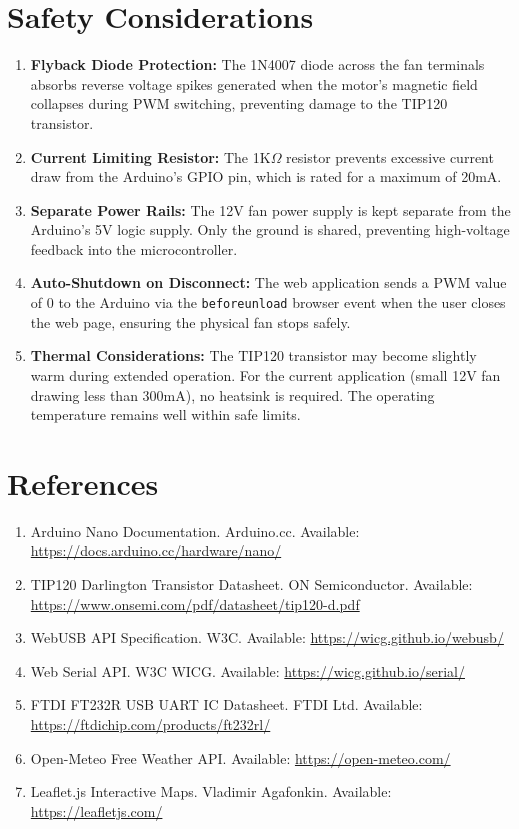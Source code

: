 \documentclass[12pt,a4paper]{article}
\begin{document}
\newpage

\section{Safety Considerations}

\begin{enumerate}
    \item \textbf{Flyback Diode Protection:} The 1N4007 diode across the fan terminals absorbs reverse voltage spikes generated when the motor's magnetic field collapses during PWM switching, preventing damage to the TIP120 transistor.
    
    \item \textbf{Current Limiting Resistor:} The 1K$\Omega$ resistor prevents excessive current draw from the Arduino's GPIO pin, which is rated for a maximum of 20mA.
    
    \item \textbf{Separate Power Rails:} The 12V fan power supply is kept separate from the Arduino's 5V logic supply. Only the ground is shared, preventing high-voltage feedback into the microcontroller.
    
    \item \textbf{Auto-Shutdown on Disconnect:} The web application sends a PWM value of 0 to the Arduino via the \texttt{beforeunload} browser event when the user closes the web page, ensuring the physical fan stops safely.
    
    \item \textbf{Thermal Considerations:} The TIP120 transistor may become slightly warm during extended operation. For the current application (small 12V fan drawing less than 300mA), no heatsink is required. The operating temperature remains well within safe limits.
\end{enumerate}

\section{References}
\begin{enumerate}
    \item Arduino Nano Documentation. Arduino.cc. Available: \url{https://docs.arduino.cc/hardware/nano/}
    \item TIP120 Darlington Transistor Datasheet. ON Semiconductor. Available: \url{https://www.onsemi.com/pdf/datasheet/tip120-d.pdf}
    \item WebUSB API Specification. W3C. Available: \url{https://wicg.github.io/webusb/}
    \item Web Serial API. W3C WICG. Available: \url{https://wicg.github.io/serial/}
    \item FTDI FT232R USB UART IC Datasheet. FTDI Ltd. Available: \url{https://ftdichip.com/products/ft232rl/}
    \item Open-Meteo Free Weather API. Available: \url{https://open-meteo.com/}
    \item Leaflet.js Interactive Maps. Vladimir Agafonkin. Available: \url{https://leafletjs.com/}
\end{enumerate}
\end{document}
